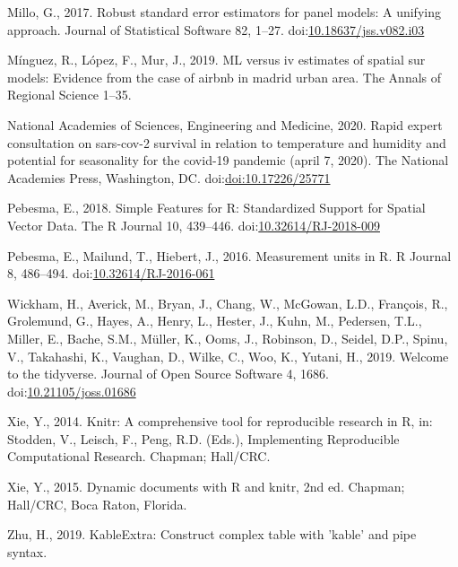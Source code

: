 \documentclass[]{elsarticle} %
\begin{document}
\leavevmode\hypertarget{ref-Millo2017robust}{}%
Millo, G., 2017. Robust standard error estimators for panel models: A
unifying approach. Journal of Statistical Software 82, 1--27.
doi:\href{https://doi.org/10.18637/jss.v082.i03}{10.18637/jss.v082.i03}

\leavevmode\hypertarget{ref-Minguez2019}{}%
Mínguez, R., López, F., Mur, J., 2019. ML versus iv estimates of spatial
sur models: Evidence from the case of airbnb in madrid urban area. The
Annals of Regional Science 1--35.

\leavevmode\hypertarget{ref-National2020rapid}{}%
National Academies of Sciences, Engineering and Medicine, 2020. Rapid
expert consultation on sars-cov-2 survival in relation to temperature
and humidity and potential for seasonality for the covid-19 pandemic
(april 7, 2020). The National Academies Press, Washington, DC.
doi:\href{https://doi.org/doi:10.17226/25771}{doi:10.17226/25771}

\leavevmode\hypertarget{ref-Pebesma2018}{}%
Pebesma, E., 2018. Simple Features for R: Standardized Support for
Spatial Vector Data. The R Journal 10, 439--446.
doi:\href{https://doi.org/10.32614/RJ-2018-009}{10.32614/RJ-2018-009}

\leavevmode\hypertarget{ref-Pebesma2016}{}%
Pebesma, E., Mailund, T., Hiebert, J., 2016. Measurement units in R. R
Journal 8, 486--494.
doi:\href{https://doi.org/10.32614/RJ-2016-061}{10.32614/RJ-2016-061}

\leavevmode\hypertarget{ref-Wickham2019}{}%
Wickham, H., Averick, M., Bryan, J., Chang, W., McGowan, L.D., François,
R., Grolemund, G., Hayes, A., Henry, L., Hester, J., Kuhn, M., Pedersen,
T.L., Miller, E., Bache, S.M., Müller, K., Ooms, J., Robinson, D.,
Seidel, D.P., Spinu, V., Takahashi, K., Vaughan, D., Wilke, C., Woo, K.,
Yutani, H., 2019. Welcome to the tidyverse. Journal of Open Source
Software 4, 1686.
doi:\href{https://doi.org/10.21105/joss.01686}{10.21105/joss.01686}

\leavevmode\hypertarget{ref-Xie2014}{}%
Xie, Y., 2014. Knitr: A comprehensive tool for reproducible research in
R, in: Stodden, V., Leisch, F., Peng, R.D. (Eds.), Implementing
Reproducible Computational Research. Chapman; Hall/CRC.

\leavevmode\hypertarget{ref-Xie2015}{}%
Xie, Y., 2015. Dynamic documents with R and knitr, 2nd ed. Chapman;
Hall/CRC, Boca Raton, Florida.

\leavevmode\hypertarget{ref-Zhu2019}{}%
Zhu, H., 2019. KableExtra: Construct complex table with 'kable' and pipe
syntax.
\end{document}
